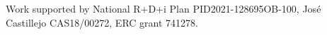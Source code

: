 \documentclass[sigconf,screen,review]{acmart}
\begin{document}



\maketitle











\begin{acks}
    Work supported by National R+D+i Plan PID2021-128695OB-100, José Castillejo CAS18/00272, ERC grant 741278.
\end{acks}


%

\end{document}
